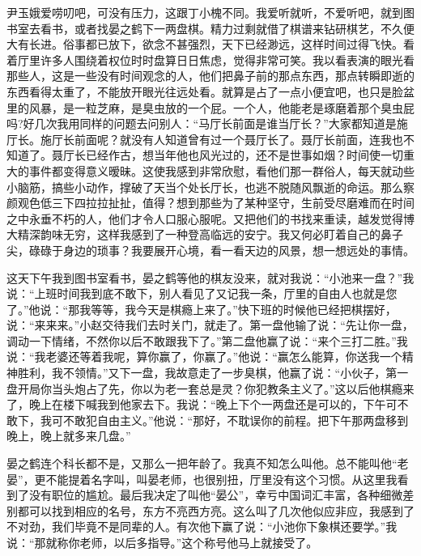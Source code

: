 \documentclass[12pt,oneside]{book}
\begin{document}
尹玉娥爱唠叨吧，可没有压力，这跟丁小槐不同。我爱听就听，不爱听吧，就到图书室去看书，或者找晏之鹤下一两盘棋。精力过剩就借了棋谱来钻研棋艺，不久便大有长进。俗事都已放下，欲念不甚强烈，天下已经渺远，这样时间过得飞快。看着厅里许多人围绕着权位时时盘算日日焦虑，觉得非常可笑。我以看表演的眼光看那些人，这是一些没有时间观念的人，他们把鼻子前的那点东西，那点转瞬即逝的东西看得太重了，不能放开眼光往远处看。就算是占了一点小便宜吧，也只是脸盆里的风暴，是一粒芝麻，是臭虫放的一个屁。一个人，他能老是琢磨着那个臭虫屁吗?好几次我用同样的问题去问别人：``马厅长前面是谁当厅长？''大家都知道是施厅长。施厅长前面呢？就没有人知道曾有过一个聂厅长了。聂厅长前面，连我也不知道了。聂厅长已经作古，想当年他也风光过的，还不是世事如烟？时间使一切重大的事件都变得意义暧昧。这使我感到非常欣慰，看他们那一群俗人，每天就动些小脑筋，搞些小动作，撑破了天当个处长厅长，也逃不脱随风飘逝的命运。那么察颜观色低三下四拉拉扯扯，值得？想到那些为了某种坚守，生前受尽磨难而在时间之中永垂不朽的人，他们才令人口服心服呢。又把他们的书找来重读，越发觉得博大精深韵味无穷，这样我感到了一种登高临远的安宁。我又何必盯着自己的鼻子尖，碌碌于身边的琐事？我要展开心境，看一看天边的风景，想一想远处的事情。

这天下午我到图书室看书，晏之鹤等他的棋友没来，就对我说：``小池来一盘？''我说：``上班时间我到底不敢下，别人看见了又记我一条，厅里的自由人也就是您了。''他说：``那我等等，我今天是棋瘾上来了。''快下班的时候他已经把棋摆好，说：``来来来。''小赵交待我们去时关门，就走了。第一盘他输了说：``先让你一盘，调动一下情绪，不然你以后不敢跟我下了。''第二盘他赢了说：``来个三打二胜。''我说：``我老婆还等着我呢，算你赢了，你赢了。''他说：``赢怎么能算，你送我一个精神胜利，我不领情。''又下一盘，我故意走了一步臭棋，他赢了说：``小伙子，第一盘开局你当头炮占了先，你以为老一套总是灵？你犯教条主义了。''这以后他棋瘾来了，晚上在楼下喊我到他家去下。我说：``晚上下个一两盘还是可以的，下午可不敢下，我可不敢犯自由主义。''他说：``那好，不耽误你的前程。把下午那两盘移到晚上，晚上就多来几盘。''

晏之鹤连个科长都不是，又那么一把年龄了。我真不知怎么叫他。总不能叫他``老晏''，更不能提着名字叫，叫晏老师，也很别扭，厅里没有这个习惯。从这里我看到了没有职位的尴尬。最后我决定了叫他``晏公''，幸亏中国词汇丰富，各种细微差别都可以找到相应的名号，东方不亮西方亮。这么叫了几次他似应非应，我感到了不对劲，我们毕竟不是同辈的人。有次他下赢了说：``小池你下象棋还要学。''我说：``那就称你老师，以后多指导。''这个称号他马上就接受了。
\end{document}

